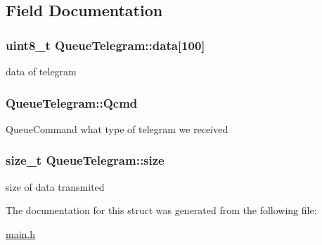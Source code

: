 \subsection{Field Documentation}
\hypertarget{struct_queue_telegram_a7e29925d18b381b18d7987672ed5a3f9}{
\subsubsection[{data}]{\setlength{\rightskip}{0pt plus 5cm}uint8\+\_\+t Queue\+Telegram\+::data\mbox{[}100\mbox{]}}}\label{struct_queue_telegram_a7e29925d18b381b18d7987672ed5a3f9}
data of telegram \hypertarget{struct_queue_telegram_a752eb6858a0e18355371dc6cdc559e64}{
\subsubsection[{Qcmd}]{ Queue\+Telegram\+::\+Qcmd}}\label{struct_queue_telegram_a752eb6858a0e18355371dc6cdc559e64}
Queue\+Command what type of telegram we received \hypertarget{struct_queue_telegram_a5adaf2ba7c2db4f8f198143783d09db3}{
\subsubsection[{size}]{\setlength{\rightskip}{0pt plus 5cm}size\+\_\+t Queue\+Telegram\+::size}}\label{struct_queue_telegram_a5adaf2ba7c2db4f8f198143783d09db3}
size of data transmited 

The documentation for this struct was generated from the following file\+:\begin{DoxyCompactItemize}
\item 
\hyperlink{main_8h}{main.\+h}\end{DoxyCompactItemize}
